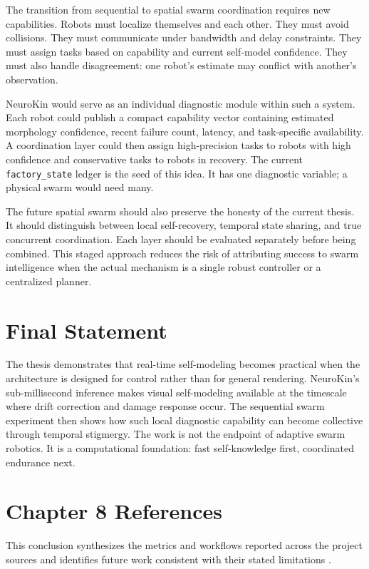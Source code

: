 \documentclass[12pt,a4paper,oneside]{report}
\begin{document}
The transition from sequential to spatial swarm coordination requires new capabilities. Robots must localize themselves and each other. They must avoid collisions. They must communicate under bandwidth and delay constraints. They must assign tasks based on capability and current self-model confidence. They must also handle disagreement: one robot's estimate may conflict with another's observation.

NeuroKin would serve as an individual diagnostic module within such a system. Each robot could publish a compact capability vector containing estimated morphology confidence, recent failure count, latency, and task-specific availability. A coordination layer could then assign high-precision tasks to robots with high confidence and conservative tasks to robots in recovery. The current \texttt{factory\_state} ledger is the seed of this idea. It has one diagnostic variable; a physical swarm would need many.

The future spatial swarm should also preserve the honesty of the current thesis. It should distinguish between local self-recovery, temporal state sharing, and true concurrent coordination. Each layer should be evaluated separately before being combined. This staged approach reduces the risk of attributing success to swarm intelligence when the actual mechanism is a single robust controller or a centralized planner.

\section{Final Statement}

The thesis demonstrates that real-time self-modeling becomes practical when the architecture is designed for control rather than for general rendering. NeuroKin's sub-millisecond inference makes visual self-modeling available at the timescale where drift correction and damage response occur. The sequential swarm experiment then shows how such local diagnostic capability can become collective through temporal stigmergy. The work is not the endpoint of adaptive swarm robotics. It is a computational foundation: fast self-knowledge first, coordinated endurance next.

\section*{Chapter 8 References}

This conclusion synthesizes the metrics and workflows reported across the project sources and identifies future work consistent with their stated limitations \cite{bongard2006resilient,cully2015robots,kwiatkowski2019task,chen2022full,hu2024teaching,kerbl20233d,hu2025learning}.
\end{document}
